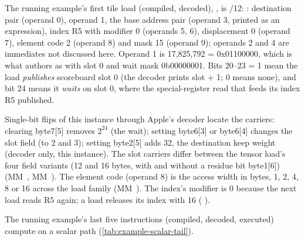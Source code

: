 The running example's first tile load (compiled, decoded),
, is /12:
: destination pair (operand 0), operand 1, the base address pair
(operand 3, printed as an expression), index R5 with modifier 0 (operands 5, 6), displacement 0 (operand 7), element code
2 (operand 8) and mask 15 (operand 9); operands 2 and 4 are immediates not discussed here. Operand 1 is 17,825,792 = 0x01100000,
which is what  authors as  with slot 0 and wait mask
0b00000001. Bits 20–23 = 1 mean the load \emph{publishes} scoreboard slot 0 (the decoder prints slot + 1; 0 means
none), and bit 24 means it \emph{waits} on slot 0, where the special-register read that feeds its index R5 published.

Single-bit flips of this instance through Apple's decoder locate the carriers: clearing byte7{[}5{]} removes $2^{24}$ (the wait);
  setting byte6{[}3{]} or byte6{[}4{]} changes the slot field (to 2 and 3); setting byte2{[}5{]} adds 32, the destination keep weight
(decoder only, this instance). The slot carriers differ between the tensor load's four field variants (12 and 16 bytes, with
and without a residue bit byte1{[}6{]}) (MM~, MM~). The
element code (operand 8) is the access width in bytes, 1, 2, 4, 8 or 16 across the load family (MM~). The
index's modifier is 0 because the next load reads R5 again; a load releases its index with 16 ( ).

The running example's last five instructions (compiled, decoded, executed) compute  on a scalar path (\cref{tab:example-scalar-tail}).


